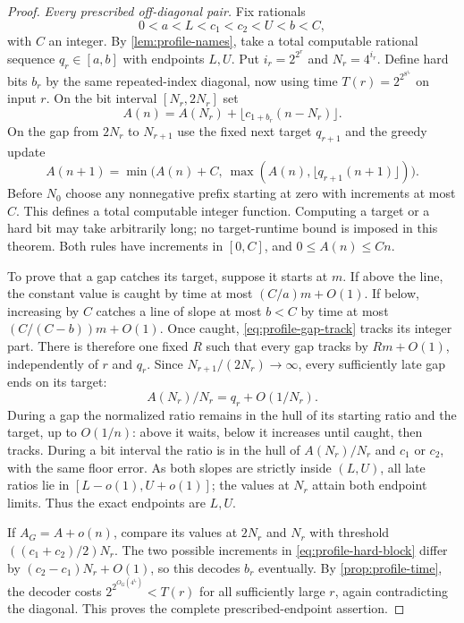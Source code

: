 \begin{proof}
\par\smallskip\noindent\textit{Every prescribed off-diagonal pair.}\quad
Fix rationals
\[
 0<a<L<c_1<c_2<U<b<C,
\]
with $C$ an integer. By \cref{lem:profile-names}, take a total computable rational sequence $q_r\in[a,b]$ with endpoints $L,U$. Put $i_r=2^{2^r}$ and $N_r=4^{i_r}$. Define hard bits $b_r$ by the same repeated-index diagonal, now using time $T(r)=2^{2^{8^{i_r}}}$ on input $r$.
On the bit interval $[N_r,2N_r]$ set
\begin{equation}\label{eq:profile-hard-block}
 A(n)=A(N_r)+\lfloor c_{1+b_r}(n-N_r)\rfloor.
\end{equation}
On the gap from $2N_r$ to $N_{r+1}$ use the fixed next target $q_{r+1}$ and the greedy update
\begin{equation}\label{eq:profile-gap-track}
 A(n+1)=\min\bigl(A(n)+C,\ \max(A(n),\lfloor q_{r+1}(n+1)\rfloor)\bigr).
\end{equation}
Before $N_0$ choose any nonnegative prefix starting at zero with increments at most $C$. This defines a total computable integer function. Computing a target or a hard bit may take arbitrarily long; no target-runtime bound is imposed in this theorem. Both rules have increments in $[0,C]$, and $0\le A(n)\le Cn$.

To prove that a gap catches its target, suppose it starts at $m$. If above the line, the constant value is caught by time at most $(C/a)m+O(1)$. If below, increasing by $C$ catches a line of slope at most $b<C$ by time at most $(C/(C-b))m+O(1)$. Once caught, \eqref{eq:profile-gap-track} tracks its integer part. There is therefore one fixed $R$ such that every gap tracks by $Rm+O(1)$, independently of $r$ and $q_r$. Since $N_{r+1}/(2N_r)\to\infty$, every sufficiently late gap ends on its target:
\[
 A(N_r)/N_r=q_r+O(1/N_r).
\]
During a gap the normalized ratio remains in the hull of its starting ratio and the target, up to $O(1/n)$: above it waits, below it increases until caught, then tracks. During a bit interval the ratio is in the hull of $A(N_r)/N_r$ and $c_1$ or $c_2$, with the same floor error. As both slopes are strictly inside $(L,U)$, all late ratios lie in $[L-o(1),U+o(1)]$; the values at $N_r$ attain both endpoint limits. Thus the exact endpoints are $L,U$.

If $A_G=A+o(n)$, compare its values at $2N_r$ and $N_r$ with threshold $((c_1+c_2)/2)N_r$. The two possible increments in \eqref{eq:profile-hard-block} differ by $(c_2-c_1)N_r+O(1)$, so this decodes $b_r$ eventually. By \cref{prop:profile-time}, the decoder costs $2^{2^{O_G(4^{i_r})}}<T(r)$ for all sufficiently large $r$, again contradicting the diagonal. This proves the complete prescribed-endpoint assertion.
\end{proof}

